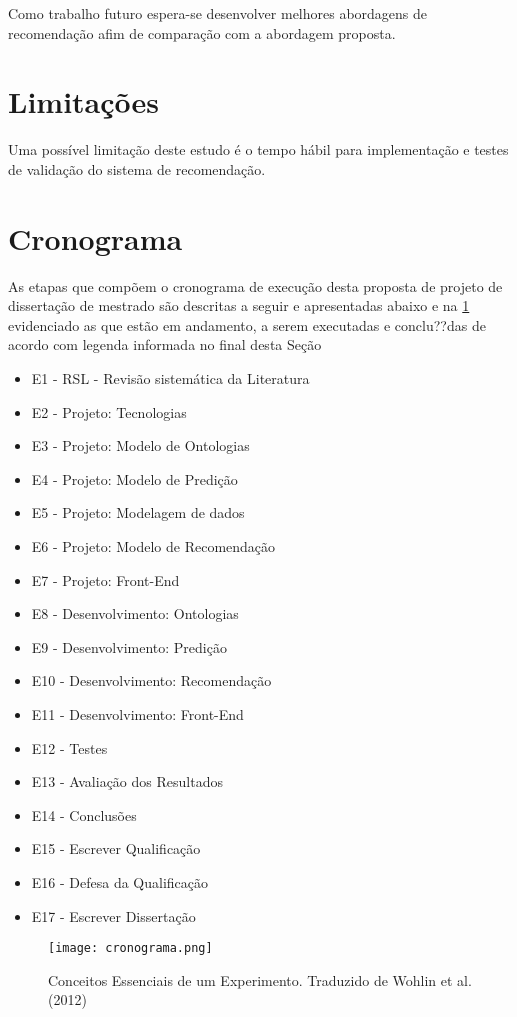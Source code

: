 Como trabalho futuro espera-se desenvolver melhores abordagens de recomendação afim de comparação com a abordagem proposta.

\section{Limitações}
\label{sec:limit}

Uma possível limitação deste estudo é o tempo hábil para implementação e testes de
validação do sistema de recomendação.

\section{Cronograma}
\label{sec:cron}

As etapas que compõem o cronograma de execução desta proposta de projeto de dissertação de mestrado são descritas a seguir e apresentadas abaixo e na \ref{fig:cronograma} evidenciado as que estão em andamento, a serem executadas e conclu??das de acordo com legenda informada no final desta Seção


\begin{itemize}
	\item E1 - RSL - Revisão sistemática da Literatura
	\item E2 - Projeto: Tecnologias
	\item E3 - Projeto: Modelo de Ontologias
	\item E4 - Projeto: Modelo de Predição
	\item E5 - Projeto: Modelagem de dados
	\item E6 - Projeto: Modelo de Recomendação
	\item E7 - Projeto: Front-End
	\item E8 - Desenvolvimento: Ontologias
	\item E9 - Desenvolvimento: Predição
	\item E10 - Desenvolvimento: Recomendação
	\item E11 - Desenvolvimento: Front-End
	\item E12 - Testes
	\item E13 - Avaliação dos Resultados
	\item E14 - Conclusões
	\item E15 - Escrever Qualificação
	\item E16 - Defesa da Qualificação
	\item E17 - Escrever Dissertação
\end{itemize}

\begin{figure}[htb]
	\centering					
	{\texttt{[image: cronograma.png]}}
	
	\caption{Conceitos Essenciais de um Experimento. Traduzido de Wohlin et al. (2012)}
	\label{fig:cronograma}
\end{figure}
